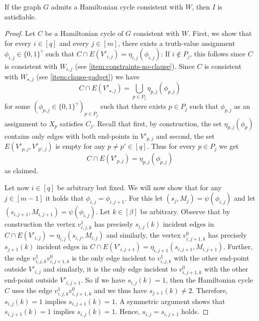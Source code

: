 \documentclass[a4paper,UKenglish,cleveref, autoref, thm-restate]{lipics-v2021}
\begin{document}
\begin{claim}
	If the graph $G$ admits a Hamiltonian cycle consistent with $W$, then $I$ is satisfiable.
\end{claim}

\begin{proof}
	Let $C$ be a Hamiltonian cycle of $G$ consistent with $W$.
	First, we show that for every $i \in [q]$ and every $j \in [m]$, there exists a truth-value assignment $\phi_{i,j} \in \{0, 1\}^\gamma$ such that $C \cap E(V'_{i,j}) = \eta_{i,j}(\phi_{i,j})$: 
	If $i \notin P_j$, this follows since $C$ is consistent with $W_{i,j}$ (see \cref{item:constraints-no-clause}).
	Since $C$ is consistent with $W_{\star, j}$ (see \cref{item:clause-gadget}) we have 
	\[
		C \cap E(V'_{\star, j}) = \bigcup_{p \in P_j} \eta_{p, j}(\phi_{p, j})
	\]
	for some $(\phi_{p, j} \in \{0,1\}^\gamma)_{p \in P_j}$ such that there exists $p \in P_j$ such that $\phi_{p,j}$ as an assignment to $X_p$ satisfies $C_j$.
	Recall that first, by construction, the set $\eta_{p, j}(\phi_p)$ contains only edges with both end-points in $V'_{p, j}$ and second, the set $E(V'_{p, j}, V'_{p', j})$ is empty for any $p \neq p' \in [q]$.
	Thus for every $p \in P_j$ we get 
	\[
		C \cap E(V'_{p, j}) = \eta_{p, j}(\phi_{p, j})
	\]
	as claimed.
	
	Let now $i \in [q]$ be arbitrary but fixed.
	We will now show that for any $j \in [m-1]$ it holds that $\phi_{i,j} = \phi_{i,j+1}$.
	For this let $(s_j, M_j) = \psi(\phi_{i,j})$ and let $(s_{i,j+1}, M_{i,j+1}) = \psi(\phi_{i,j})$.
	Let $k \in [\beta]$ be arbitrary.
	Observe that by construction the vertex $v_{i,j,k}^1$ has precisely $s_{i,j}(k)$ incident edges in $C \cap E(V'_{i,j}) = \eta_{i,j}(s_{i,j}, M_{i,j})$ and similarly, the vertex $v_{i,j+1,k}^0$ has precisely $s_{j+1}(k)$ incident edges in $C \cap E(V'_{i,j+1}) = \eta_{i,j+1}(s_{i,j+1}, M_{i,j+1})$.
	Further, the edge $v_{i,j,k}^1 v_{i,j+1,k}^0$ is the only edge incident to $v_{i,j,k}^1$ with the other end-point outside $V'_{i,j}$ and similarly, it is the only edge incident to $v_{i,j+1,k}^0$ with the other end-point outside $V'_{i,j+1}$.
	So if we have $s_{i,j}(k) = 1$, then the Hamiltonian cycle $C$ uses the edge $v_{i,j,k}^1 v_{i,j+1,k}^0$ and we thus have $s_{j+1}(k) \neq 2$.
	Therefore, $s_{i,j}(k) = 1$ implies $s_{i,j+1}(k) = 1$. 
	A symmetric argument shows that $s_{i,j+1}(k) = 1$ implies $s_{i,j}(k) = 1$. 
	Hence, $s_{i,j} = s_{i,j+1}$ holds.
	

\end{proof}
\end{document}
